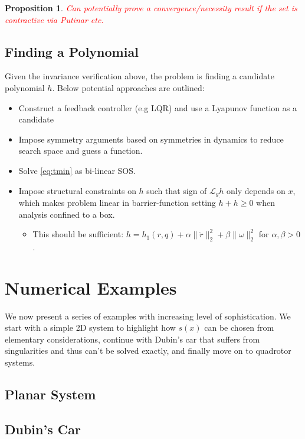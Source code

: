 \documentclass[conference]{IEEEtran}
\newtheorem{prop}{Proposition}
\begin{document}
\begin{prop}
	\textcolor{red}{Can potentially prove a convergence/necessity result if the set is \emph{contractive} \cite{Ames2017} via Putinar etc.}
\end{prop}



\subsection{Finding a Polynomial}

Given the invariance verification above, the problem is finding a candidate polynomial $h$. Below potential approaches are outlined:
\begin{itemize}
   \item Construct a feedback controller (e.g LQR) and use a Lyapunov function as a candidate
   \item Impose symmetry arguments based on symmetries in dynamics to reduce search space and guess a function.
   \item Solve \eqref{eq:tmin} as bi-linear SOS.
   \item Impose structural constraints on $h$ such that sign of $\mathcal L_g h$ only depends on $x$, which makes problem linear in barrier-function setting $\dot h + h \geq 0$ when analysis confined to a box.
   \begin{itemize}
     \item This should be sufficient: $h = h_1(r,q) + \alpha \| \dot r \|^2_2 + \beta \| \omega \|_2^2$ for $\alpha, \beta > 0$.
   \end{itemize} 
\end{itemize} 

\section{Numerical Examples}

We now present a series of examples with increasing level of sophistication. We start with a simple 2D system to highlight how $s(x)$ can be chosen from elementary considerations, continue with Dubin's car that suffers from singularities and thus can't be solved exactly, and finally move on to quadrotor systems.

\subsection{Planar System}

\subsection{Dubin's Car}
\end{document}
